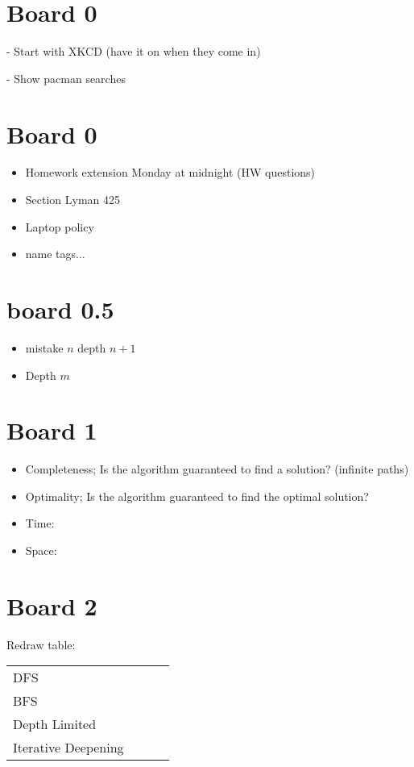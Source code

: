 \documentclass[10pt]{article}
\begin{document}
\MakeScribeTop{}

\section{Board 0}

- Start with XKCD (have it on when they come in)

- Show pacman searches

\section{Board 0}

\begin{itemize}
\item Homework extension Monday at midnight (HW questions)
\item Section Lyman 425
\item Laptop policy
\item name tags...
\end{itemize}

\section{board 0.5}
\begin{itemize}
\item mistake $n$ depth $n+1$
\item Depth $m$ 
\end{itemize}

\section{Board 1}
\begin{itemize}
\item Completeness; Is the algorithm guaranteed to find a solution? (infinite paths)
\item Optimality; Is the algorithm guaranteed to find the optimal solution?
\item Time:
\item Space:
\end{itemize}

\section{Board 2}

Redraw table:

\begin{table}
  \centering
  \begin{tabular}{llll}
    
    DFS &  \\
    BFS &  \\
    Depth Limited &  \\
    Iterative Deepening & \\
  \end{tabular}
\end{table}
\end{document}
